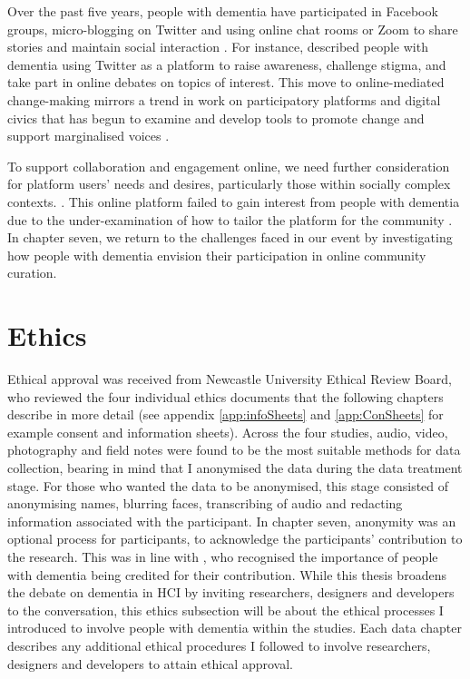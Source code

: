 Over the past five years, people with dementia have participated in Facebook groups, micro-blogging on Twitter and using online chat rooms or Zoom to share stories and maintain social interaction \citep{lazar_safe_2019}. For instance, \cite{talbot_how_2020} described people with dementia using Twitter as a platform to raise awareness, challenge stigma, and take part in online debates on topics of interest. This move to online-mediated change-making mirrors a trend in work on participatory platforms and digital civics that has begun to examine and develop tools to promote change and support marginalised voices \citep{corbett_exploring_2018}. 

To support collaboration and engagement online, we need further consideration for platform users’ needs and desires, particularly those within socially complex contexts. . This online platform failed to gain interest from people with dementia due to the under-examination of how to tailor the platform for the community \citep{lindqvist2018contrasting}. In chapter seven, we return to the challenges faced in our event by investigating how people with dementia envision their participation in online community curation.

\section{Ethics}
\label{Method:Ethics}
Ethical approval was received from Newcastle University Ethical Review Board, who reviewed the four individual ethics documents that the following chapters describe in more detail (see appendix \ref{app:infoSheets} and \ref{app:ConSheets} for example consent and information sheets). Across the four studies, audio, video, photography and field notes were found to be the most suitable methods for data collection, bearing in mind that I anonymised the data during the data treatment stage. For those who wanted the data to be anonymised, this stage consisted of anonymising names, blurring faces, transcribing of audio and redacting information associated with the participant. In chapter seven, anonymity was an optional process for participants, to acknowledge the participants' contribution to the research. This was in line with \cite{hendriks_valuing_2018}, who recognised the importance of people with dementia being credited for their contribution. While this thesis broadens the debate on dementia in HCI by inviting researchers, designers and developers to the conversation, this ethics subsection will be about the ethical processes I introduced to involve people with dementia within the studies. Each data chapter describes any additional ethical procedures I followed to involve researchers, designers and developers to attain ethical approval.

